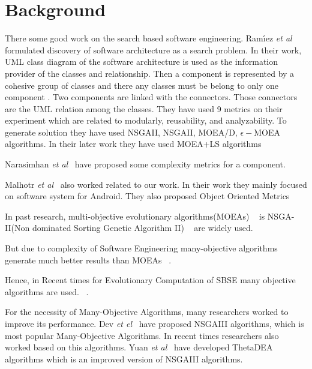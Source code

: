 \documentclass[letterpaper, 10 pt, conference]{ieeeconf}  %
\begin{document}
\section{Background}


There some good work on the search based software engineering. 
Ram{\'\i}ez \textit{et al}~\cite{ramirez2015approach} formulated discovery of software architecture as a search problem.
In their work, UML class diagram of the software architecture is used as the information provider of the classes and relationship. Then a component is represented by a cohesive group of classes and there any classes must be belong to only one component \cite{ramirez2016comparative}. Two components are linked with the connectors. Those connectors are the UML relation among the classes. They have used 9 metrics on their experiment which are related to modularly, reusability, and analyzability. To generate solution they have used NSGAII, NSGAII, MOEA/D, $\epsilon - $MOEA algorithms. In their later work they have used MOEA+LS algorithms~\cite{ramirez2017effect}

Narasimhan \textit{et al}~\cite{narasimhan2004new} have proposed some complexity metrics for a component. 

Malhotr  \textit{et al}~\cite{malhotra2017exploratory} also worked related to our work. In their work they mainly focused on software system for Android. They also proposed Object Oriented Metrics 


In past research, multi-objective evolutionary algorithms(MOEAs) ~\cite{zhou2011multiobjective} is NSGA-II(Non dominated Sorting Genetic Algorithm II) ~\cite{deb2002fast} are widely used.

But due to complexity of Software Engineering many-objective algorithms generate much better results than MOEAs ~\cite{purshouse2007evolutionary, coello2007evolutionary}. 

Hence, in Recent times for Evolutionary Computation of SBSE many objective algorithms are used.  ~\cite{ramirez2016comparative,bader2011hype, yang2013grid, zhang2007moea}.

For the necessity of Many-Objective Algorithms, many researchers worked to improve its performance. Dev \textit{et el}~\cite{deb2014evolutionary} have proposed NSGAIII algorithms, which is most popular Many-Objective Algorithms. In recent times researchers also worked based on this algorithms. Yuan \textit{et al}~\cite{yuan2016new} have developed ThetaDEA algorithms which is an improved version of NSGAIII algorithms. 
\end{document}
